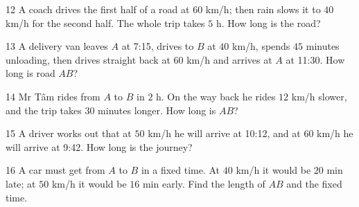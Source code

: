 \gap
\begin{probbox}{12}{\relax}
A coach drives the first half of a road at $60$ km/h; then rain slows it to $40$ km/h for the second half. The whole trip takes $5$ h. How long is the road?
\end{probbox}
\gap
\begin{probbox}{13}{\relax}
A delivery van leaves $A$ at 7:15, drives to $B$ at $40$ km/h, spends $45$ minutes unloading, then drives straight back at $60$ km/h and arrives at $A$ at 11:30. How long is road $AB$?
\end{probbox}
\gap
\begin{probbox}{14}{\relax}
Mr Tâm rides from $A$ to $B$ in $2$ h. On the way back he rides $12$ km/h slower, and the trip takes $30$ minutes longer. How long is $AB$?
\end{probbox}
\gap
\begin{probbox}{15}{\relax}
A driver works out that at $50$ km/h he will arrive at 10:12, and at $60$ km/h he will arrive at 9:42. How long is the journey?
\end{probbox}
\gap
\begin{probbox}{16}{\relax}
A car must get from $A$ to $B$ in a fixed time. At $40$ km/h it would be $20$ min late; at $50$ km/h it would be $16$ min early. Find the length of $AB$ and the fixed time.
\end{probbox}
